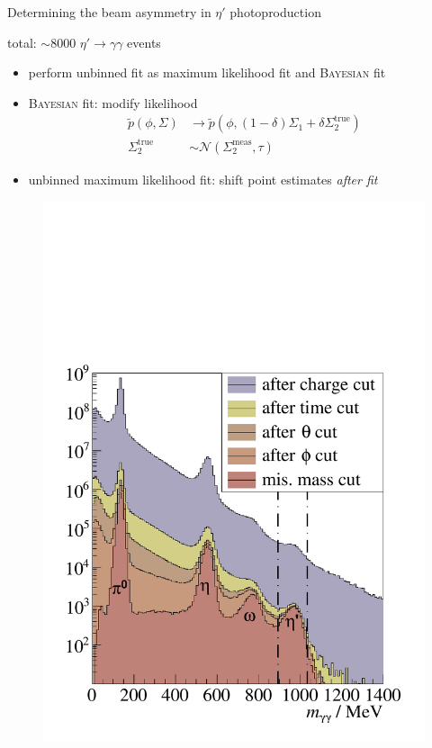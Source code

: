 \documentclass[11pt,aspectratio=169,dvipsnames]{beamer}
\begin{document}
	\begin{frame}{Determining the beam asymmetry in $\eta'$ photoproduction}
		
		
		\begin{minipage}{0.49\linewidth}
			total: $\sim 8000$ $\eta'\to\gamma\gamma$ events
			\begin{itemize}
				\item perform unbinned fit as maximum likelihood fit and \textsc{Bayesian} fit
				\item \textsc{Bayesian} fit: modify likelihood
					 \begin{align*}
					 	\tilde{p}\left(\phi,\Sigma\right)&\to\tilde{p}\left(\phi,(1-\delta)\Sigma_1+\delta\Sigma_2^\text{true}\right)\\
					 	\Sigma_2^\text{true}&\sim\mathcal{N}(\Sigma_2^\text{meas},\tau)
					 \end{align*}

			\item unbinned maximum likelihood fit: shift point estimates \emph{after fit}
			\end{itemize}
		\end{minipage}
		\begin{minipage}{.49\linewidth}
			\begin{figure}
				\centering
				\includegraphics[width=1.05\linewidth]{../../figs/hydrogen/inc_mass_pretty_talk.pdf}
			\end{figure}
		\end{minipage}
		
	\end{frame}
	
\end{document}
